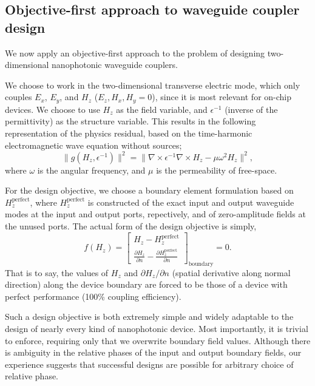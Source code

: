 \documentclass[letterpaper,10pt]{article}
\begin{document}
\subsection{Objective-first approach to waveguide coupler design}
We now apply an objective-first approach to the problem of designing 
    two-dimensional nanophotonic waveguide couplers.

We choose to work in the two-dimensional transverse electric mode,
    which only couples $E_x$, $E_y$, and $H_z$ ($E_z, H_x, H_y = 0$),
    since it is most relevant for on-chip devices\cite{}.
We choose to use $H_z$ as the field variable, 
    and $\epsilon^{-1}$ (inverse of the permittivity) 
    as the structure variable.
This results in the following representation of the physics residual, 
    based on the time-harmonic electromagnetic wave equation without sources;
    \begin{equation}
    \|g(H_z, \epsilon^{-1})\|^2 = 
    \| \nabla \times \epsilon^{-1} \nabla \times H_z - \mu \omega^2 H_z \|^2,
    \end{equation}
    where $\omega$ is the angular frequency,
    and $\mu$ is the permeability of free-space.

For the design objective, we choose a boundary element formulation
    based on $H_z^\text{perfect}$,
    where $H_z^\text{perfect}$ is constructed 
    of the exact input and output waveguide modes at the input and output ports,
    repectively, and of zero-amplitude fields at the unused ports.
The actual form of the design objective is simply, 
    \begin{equation}
    f(H_z) = \begin{bmatrix}
        H_z - H_z^\text{perfect} \\
        \frac{\partial H_z}{\partial n} - 
            \frac{\partial H_z^\text{perfect}}{\partial n}
        \end{bmatrix}_\text{boundary}
        = 0.
    \end{equation}
That is to say,
    the values of $H_z$ and $\partial H_z / \partial n$
    (spatial derivative along normal direction)
    along the device boundary are forced to be 
    those of a device with perfect performance 
    (100\% coupling efficiency).
     
Such a design objective is both extremely simple and widely adaptable 
    to the design of nearly every kind of nanophotonic device.
Most importantly, it is trivial to enforce,
    requiring only that we overwrite boundary field values.
Although there is ambiguity in the relative phases of 
    the input and output boundary fields,
    our experience suggests that successful designs are possible for 
    arbitrary choice of relative phase.
\end{document}
